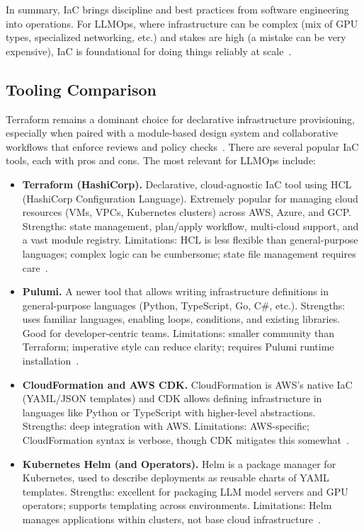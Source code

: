 In summary, IaC brings discipline and best practices from software engineering into operations. 
For LLMOps, where infrastructure can be complex (mix of GPU types, specialized networking, etc.) and stakes are high (a mistake can be very expensive), IaC is foundational for doing things reliably at scale~\cite{srivatsa2024-iac-llm}.

\subsection{Tooling Comparison}
\label{sec:iac-tools}


Terraform remains a dominant choice for declarative infrastructure provisioning, especially when paired with a module-based design system and collaborative workflows that enforce reviews and policy checks~\cite{terraform_modules,terraform_recommended_practices,aws_terraform_structure}.
There are several popular IaC tools, each with pros and cons. The most relevant for LLMOps include:

\begin{itemize}
  \item \textbf{Terraform (HashiCorp).} 
  Declarative, cloud-agnostic IaC tool using HCL (HashiCorp Configuration Language). 
  Extremely popular for managing cloud resources (VMs, VPCs, Kubernetes clusters) across AWS, Azure, and GCP. 
  Strengths: state management, plan/apply workflow, multi-cloud support, and a vast module registry. 
  Limitations: HCL is less flexible than general-purpose languages; complex logic can be cumbersome; state file management requires care~\cite{terraform-docs}.

  \item \textbf{Pulumi.} 
  A newer tool that allows writing infrastructure definitions in general-purpose languages (Python, TypeScript, Go, C\#, etc.). 
  Strengths: uses familiar languages, enabling loops, conditions, and existing libraries. 
  Good for developer-centric teams. 
  Limitations: smaller community than Terraform; imperative style can reduce clarity; requires Pulumi runtime installation~\cite{pulumi-docs}.

  \item \textbf{CloudFormation and AWS CDK.} 
  CloudFormation is AWS’s native IaC (YAML/JSON templates) and CDK allows defining infrastructure in languages like Python or TypeScript with higher-level abstractions. 
  Strengths: deep integration with AWS. 
  Limitations: AWS-specific; CloudFormation syntax is verbose, though CDK mitigates this somewhat~\cite{awscdk-docs}.

  \item \textbf{Kubernetes Helm (and Operators).} 
  Helm is a package manager for Kubernetes, used to describe deployments as reusable charts of YAML templates. 
  Strengths: excellent for packaging LLM model servers and GPU operators; supports templating across environments. 
  Limitations: Helm manages applications within clusters, not base cloud infrastructure~\cite{nvidia-k8s-device-plugin}.
\end{itemize}

